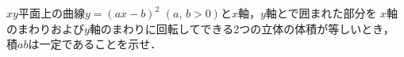 \documentclass[../../main.tex]{subfiles}
\begin{document}
$xy$平面上の曲線$y={(ax-b)}^2$ $(a, \, b>0)$と$x$軸，$y$軸とで囲まれた部分を
$x$軸のまわりおよび$y$軸のまわりに回転してできる2つの立体の体積が等しいとき，
積$ab$は一定であることを示せ．
\end{document}
